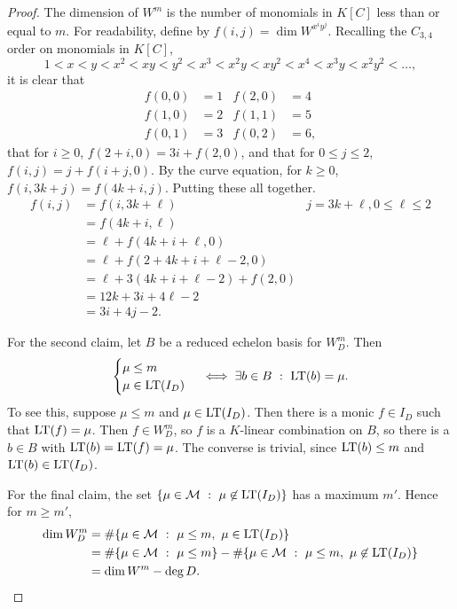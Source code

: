 \begin{proof}
  The dimension of $W^m$ is the number of monomials in $K[C]$ less than or equal to $m$.
  For readability, define by $f(i,j) = \dim W^{x^iy^j}$.
  Recalling the $C_{3,4}$ order on monomials in $K[C]$,
    \[ 1 < x < y < x^2 < xy < y^2 < x^3 < x^2y < xy^2 < x^4 < x^3y < x^2y^2 < \dots, \]
  it is clear that
  \begin{align*}
    f(0,0) &= 1 & f(2,0) &= 4 \\
    f(1,0) &= 2 & f(1,1) &= 5 \\
    f(0,1) &= 3 & f(0,2) &= 6,
  \end{align*}
  that for $i \geq 0$, $f(2 + i,0) = 3i + f(2, 0)$, and that for $0 \leq j \leq 2$, $f(i,j) = j + f(i+j,0)$.
  By the curve equation, for $k \geq 0$, $f(i, 3k + j) = f(4k + i, j)$.
  Putting these all together.
  \begin{align*}
    f(i,j)
      &= f(i, 3k + \ell) & j = 3k + \ell, 0 \leq \ell \leq 2 \\
      &= f(4k + i, \ell) \\
      &= \ell + f(4k + i + \ell, 0) \\
      &= \ell + f(2 + 4k + i + \ell - 2, 0) \\
      &= \ell + 3(4k + i + \ell - 2) + f(2, 0) \\
      &= 12k + 3i + 4\ell - 2 \\
      &= 3i + 4j - 2.
  \end{align*}
  
  For the second claim, let $B$ be a reduced echelon basis for $W_D^m$. Then
  \[ \begin{cases} \mu \leq m \\ \mu \in \operatorname{LT}(I_D) \end{cases} \iff \exists b \in B ~:~ \operatorname{LT}(b) = \mu. \]
  To see this, suppose $\mu \leq m$ and $\mu \in \operatorname{LT}(I_D)$.
  Then there is a monic $f \in I_D$ such that $\operatorname{LT}(f) = \mu$.
  Then $f \in W_D^m$, so $f$ is a $K$-linear combination on $B$,
  so there is a $b \in B$ with $\operatorname{LT}(b) = \operatorname{LT}(f) = \mu$.
  The converse is trivial, since $\operatorname{LT}(b) \leq m$ and $\operatorname{LT}(b) \in \operatorname{LT}(I_D)$.
  
  For the final claim, the set $\{ \mu \in \mathcal{M} ~:~ \mu \not\in \operatorname{LT}(I_D) \}$ has a maximum $m'$.
  Hence for $m \geq m'$,
  \begin{align*}
    \dim W_D^m
      &= \# \{ \mu \in \mathcal{M} ~:~ \mu \leq m, ~\mu \in \operatorname{LT}(I_D) \} \\
      &= \# \{ \mu \in \mathcal{M} ~:~ \mu \leq m \} - \# \{ \mu \in \mathcal{M} ~:~ \mu \leq m, ~\mu \not\in \operatorname{LT}(I_D) \} \\
      &= \dim W^m - \deg D.
  \end{align*}
\end{proof}



